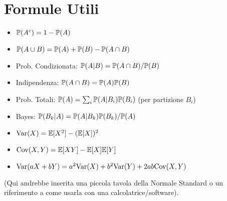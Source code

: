 \documentclass[12pt,a4paper]{article}
\begin{document}
\section{Formule Utili}
\begin{itemize}
    \item $\mathbb{P}(A^c) = 1 - \mathbb{P}(A)$
    \item $\mathbb{P}(A \cup B) = \mathbb{P}(A) + \mathbb{P}(B) - \mathbb{P}(A \cap B)$
    \item Prob. Condizionata: $\mathbb{P}(A|B) = \mathbb{P}(A \cap B) / \mathbb{P}(B)$
    \item Indipendenza: $\mathbb{P}(A \cap B) = \mathbb{P}(A)\mathbb{P}(B)$
    \item Prob. Totali: $\mathbb{P}(A) = \sum_i \mathbb{P}(A|B_i)\mathbb{P}(B_i)$ (per partizione $B_i$)
    \item Bayes: $\mathbb{P}(B_k|A) = \mathbb{P}(A|B_k)\mathbb{P}(B_k) / \mathbb{P}(A)$
    \item $\mathrm{Var}(X) = \mathbb{E}[X^2] - (\mathbb{E}[X])^2$
    \item $\mathrm{Cov}(X,Y) = \mathbb{E}[XY] - \mathbb{E}[X]\mathbb{E}[Y]$
    \item $\mathrm{Var}(aX+bY) = a^2\mathrm{Var}(X) + b^2\mathrm{Var}(Y) + 2ab\mathrm{Cov}(X,Y)$
\end{itemize}
(Qui andrebbe inserita una piccola tavola della Normale Standard o un riferimento a come usarla con una calcolatrice/software).
\end{document}
